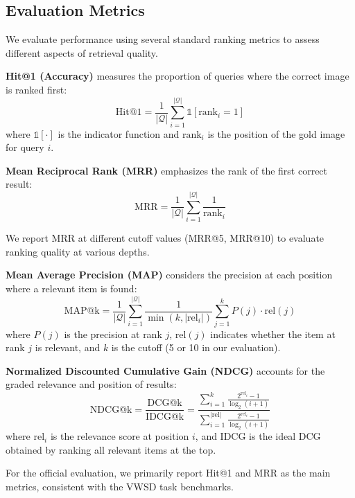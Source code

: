 \documentclass[11pt]{article}
\begin{document}
\subsection{Evaluation Metrics}
\label{subsec:evaluation}

We evaluate performance using several standard ranking metrics to assess different aspects of retrieval quality.

\textbf{Hit@1 (Accuracy)} measures the proportion of queries where the correct image is ranked first:
\begin{equation}
\text{Hit@1} = \frac{1}{|\mathcal{Q}|} \sum_{i=1}^{|\mathcal{Q}|} \mathbb{1}[\text{rank}_i = 1]
\end{equation}
where $\mathbb{1}[\cdot]$ is the indicator function and $\text{rank}_i$ is the position of the gold image for query $i$.

\textbf{Mean Reciprocal Rank (MRR)} emphasizes the rank of the first correct result:
\begin{equation}
\text{MRR} = \frac{1}{|\mathcal{Q}|} \sum_{i=1}^{|\mathcal{Q}|} \frac{1}{\text{rank}_i}
\end{equation}

We report MRR at different cutoff values (MRR@5, MRR@10) to evaluate ranking quality at various depths.

\textbf{Mean Average Precision (MAP)} considers the precision at each position where a relevant item is found:
\begin{equation}
\text{MAP@k} = \frac{1}{|\mathcal{Q}|} \sum_{i=1}^{|\mathcal{Q}|} \frac{1}{\min(k, |\text{rel}_i|)} \sum_{j=1}^{k} P(j) \cdot \text{rel}(j)
\end{equation}
where $P(j)$ is the precision at rank $j$, $\text{rel}(j)$ indicates whether the item at rank $j$ is relevant, and $k$ is the cutoff (5 or 10 in our evaluation).

\textbf{Normalized Discounted Cumulative Gain (NDCG)} accounts for the graded relevance and position of results:
\begin{equation}
\text{NDCG@k} = \frac{\text{DCG@k}}{\text{IDCG@k}} = \frac{\sum_{i=1}^{k} \frac{2^{\text{rel}_i} - 1}{\log_2(i+1)}}{\sum_{i=1}^{|\text{rel}|} \frac{2^{\text{rel}_i} - 1}{\log_2(i+1)}}
\end{equation}
where $\text{rel}_i$ is the relevance score at position $i$, and IDCG is the ideal DCG obtained by ranking all relevant items at the top.

For the official evaluation, we primarily report Hit@1 and MRR as the main metrics, consistent with the VWSD task benchmarks.
\end{document}
